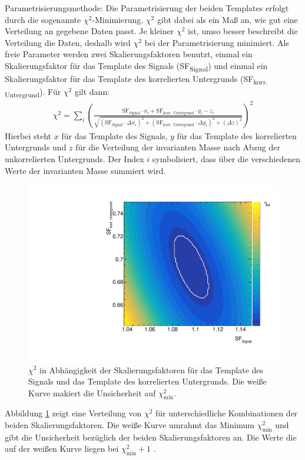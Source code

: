 Parametrisierungsmethode:
Die Parametrisierung der beiden Templates erfolgt durch die sogenannte $\chi^{2}$-Minimierung.
$\chi^{2}$ gibt dabei als ein Ma{\ss} an, wie gut eine Verteilung an gegebene Daten passt.
Je kleiner $\chi^{2}$ ist, umso besser beschreibt die Verteilung die Daten, deshalb wird $\chi^{2}$ bei der Parametrisierung minimiert.
Als freie Parameter werden zwei Skalierungsfaktoren benutzt, einmal ein Skalierungsfaktor f\"ur das Template des Signals (SF\textsubscript{Signal}) und einmal ein Skalierungsfaktor f\"ur das Template des korrelierten Untergrunds (SF\textsubscript{korr. Untergrund}).
F\"ur $\chi^{2}$ gilt dann:
\begin{align}
\chi^{2} = \sum_{i}\left(\frac{\text{SF}_\text{Signal}\cdot x_{i}+\text{SF}_\text{korr. Untergrund}\cdot y_{i}-z_{i}}{\sqrt{\left(\text{SF}_\text{Signal}\cdot\Delta x_{i}\right)^{2}+\left(\text{SF}_\text{korr. Untergrund}\cdot\Delta y_{i}\right)^{2}+\left(\Delta z\right)^{2}}}\right)^{2}
\label{eq:Chi2}
\end{align}
Hierbei steht $x$ f\"ur das Template des Signals, $y$ f\"ur das Template des korrelierten Untergrunds und $z$ f\"ur die Verteilung der invarianten Masse nach Abzug der unkorrelierten Untergrunds.
Der Index $i$  symbolisiert, dass \"uber die verschiedenen Werte der invarianten Masse summiert wird.
\begin{figure}[tp]
\centering
\includegraphics[width=.65\linewidth]{Chi2Map10_Data_2016.pdf}
\caption{$\chi^{2}$ in Abh\"angigkeit der Skalierungsfaktoren f\"ur das Template des Signals und das Template des korrelierten Untergrunds.
Die wei{\ss}e Kurve makiert die Unsicherheit auf $\chi^{2}_\text{min}$.}
\label{fig:Chi2Map}
\end{figure}
\newline
Abbildung \ref{fig:Chi2Map} zeigt eine Verteilung von $\chi^{2}$ f\"ur unterschiedliche Kombinationen der beiden Skalierungsfaktoren.
Die wei{\ss}e Kurve umrahmt das Minimum $\chi^{2}_\text{min}$ und gibt die Unsicherheit bez\"uglich der beiden Skalierungsfaktoren an.
Die Werte die auf der wei{\ss}en Kurve liegen bei $\chi^{2}_\text{min}+1$ \cite{book:chi2}.
